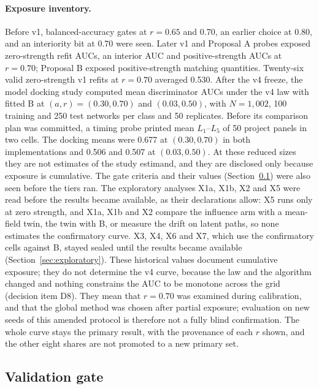 \paragraph{Exposure inventory.}
Before v1, balanced-accuracy gates at $r=0.65$ and 0.70, an earlier choice at 0.80, and an interiority bit at 0.70 were seen. %
Later v1 and Proposal A probes exposed zero-strength refit AUCs, an interior AUC and positive-strength AUCs at $r=0.70$; Proposal B exposed positive-strength matching quantities. %
Twenty-six valid zero-strength v1 refits at $r=0.70$ averaged 0.530. %
After the v4 freeze, the model docking study computed mean discriminator AUCs under the v4 law with fitted B at $(a,r)=(0.30,0.70)$ and $(0.03,0.50)$, with $N=1{,}002$, 100 training and 250 test networks per class and 50 replicates. Before its comparison plan was committed, a timing probe printed mean $L_1$--$L_5$ of 50 project panels in two cells. The docking means were 0.677 at $(0.30,0.70)$ in both implementations and 0.506 and 0.507 at $(0.03,0.50)$. At these reduced sizes they are not estimates of the study estimand, and they are disclosed only because exposure is cumulative. %
The gate criteria and their values (Section~\ref{sec:record-gate}) were also seen before the tiers ran. The exploratory analyses X1a, X1b, X2 and X5 were read before the results became available, as their declarations allow: X5 runs only at zero strength, and X1a, X1b and X2 compare the influence arm with a mean-field twin, the twin with B, or measure the drift on latent paths, so none estimates the confirmatory curve. X3, X4, X6 and X7, which use the confirmatory cells against B, stayed sealed until the results became available (Section~\ref{sec:exploratory}).
These historical values document cumulative exposure; they do not determine the v4 curve, because the law and the algorithm changed and nothing constrains the AUC to be monotone across the grid (decision item D8). They mean that $r=0.70$ was examined during calibration, and that the global method was chosen after partial exposure; evaluation on new seeds of this amended protocol is therefore not a fully blind confirmation. The whole curve stays the primary result, with the provenance of each $r$ shown, and the other eight shares are not promoted to a new primary set. %

\subsection{Validation gate}\label{sec:record-gate}\label{supp:gate-accounting}

